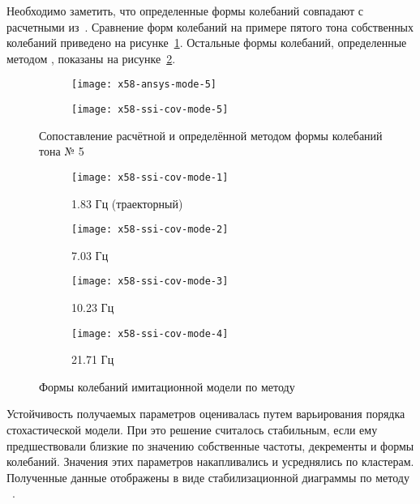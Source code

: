Необходимо заметить, что определенные формы колебаний  совпадают с расчетными из~. Сравнение форм колебаний на примере пятого тона собственных колебаний приведено на рисунке~\ref{fig:x58-mode-compare}. Остальные формы колебаний, определенные методом , показаны на рисунке~\ref{fig:x58-ssi-cov-modes}.

\begin{figure}[H]
	\centering
	\begin{subfigure}{0.49\textwidth}
		\texttt{[image: x58-ansys-mode-5]}
		\caption{}
	\end{subfigure}
	\begin{subfigure}{0.49\textwidth}
		\texttt{[image: x58-ssi-cov-mode-5]}
		\caption{}
	\end{subfigure}
     \caption{Сопоставление расчётной и определённой методом  формы колебаний тона № 5} \label{fig:x58-mode-compare}
\end{figure}

\def\sfX58{0.44\textwidth}

\begin{figure}[!htb]
	\centering
	\begin{subfigure}[b]{\sfX58}
		\texttt{[image: x58-ssi-cov-mode-1]}
		\caption{1.83 Гц (траекторный)}
	\end{subfigure}
	\hfill
	\begin{subfigure}[b]{\sfX58}
		\texttt{[image: x58-ssi-cov-mode-2]}
		\caption{7.03 Гц}
	\end{subfigure}
	\begin{subfigure}[b]{\sfX58}
		\texttt{[image: x58-ssi-cov-mode-3]}
		\caption{10.23 Гц}
	\end{subfigure}	
	\hfill
	\begin{subfigure}[b]{\sfX58}
		\texttt{[image: x58-ssi-cov-mode-4]}
		\caption{21.71 Гц}
	\end{subfigure}	
	\caption{Формы колебаний имитационной модели по методу } \label{fig:x58-ssi-cov-modes}
\end{figure}

Устойчивость получаемых параметров оценивалась путем варьирования порядка стохастической модели. При это решение считалось стабильным, если ему предшествовали близкие по значению собственные частоты, декременты и формы колебаний. Значения этих параметров накапливались и усреднялись по кластерам. Полученные данные отображены в виде стабилизационной диаграммы по методу ~.

